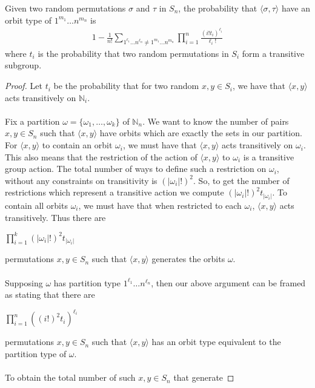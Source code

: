 \begin{theorem}\label{dixons_theorem}
  Given two random permutations $\sigma$ and $\tau$ in $S_n$, the
  probability that $\langle\sigma, \tau\rangle$ have an orbit
  type of $1^{m_1}\dots n^{m_n}$ is
  \begin{align*}
    1-\frac{1}{n!}\sum_{1^{\ell_1}\dots n^{\ell_n} \ne 1^{m_1}\dots
    n^{m_n}}\prod_{i=1}^n{\frac{(i!t_{i})^{\ell_i}}{\ell_i!}}
  \end{align*}
  where $t_i$ is the probability that two random permutations in
  $S_i$ form a transitive subgroup.
\end{theorem}
\begin{proof}
  Let $t_i$ be the probability that for two random $x,y\in S_i$, we
  have that $\langle x,y\rangle$ acts transitively on $\mathbb{N}_i$.
  \\\\Fix a partition $\omega=\{\omega_1,\dots,\omega_k\}$ of
  $\mathbb{N}_n$. We want to know the number of pairs $x,y\in S_n$ such
  that $\langle x,y\rangle$ have orbits which are exactly the sets in
  our partition. For $\langle x, y\rangle$ to contain an orbit
  $\omega_i$, we must have that $\langle x,y\rangle$ acts
  transitively on $\omega_i$. This also means that the
  restriction of the action of $\langle x,y\rangle$ to $\omega_i$ is a
  transitive group action.  The total number of ways to define such a
  restriction on $\omega_i$, without any constraints on transitivity is
  $(|\omega_i|!)^2$. So, to get the number of restrictions which
  represent a transitive action we compute
  $(|\omega_i|!)^2t_{|\omega_i|}$. To contain all orbits $\omega_i$,
  we must have that when restricted to each $\omega_i$, $\langle
  x,y\rangle$ acts transitively. Thus there are
  \begin{center}
    $\prod_{i=1}^k(|\omega_i|!)^2t_{|\omega_i|}$
  \end{center}
  permutations $x,y\in S_n$ such that $\langle x,y\rangle$ generates
  the orbits $\omega$.
  \\\\Supposing $\omega$ has partition type $1^{\ell_1}\dots
  n^{\ell_n}$, then our above argument can be framed as stating that there are
  \begin{center}
    $\prod_{i=1}^n{((i!)^2t_i)^{\ell_i}}$
  \end{center}
  permutations $x,y\in S_n$ such that $\langle x,y\rangle$ has an
  orbit type equivalent to the partition type of $\omega$.
  \\\\To obtain the total number of such $x,y \in S_n$ that generate

\end{proof}
